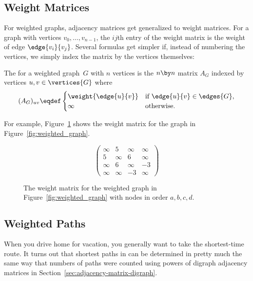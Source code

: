 \subsection{Weight Matrices}

\iffalse
  \textcolor{red}{replaced by ARM with the next paragraph}: There are many
  ways to represent a graph.  We have already seen two ways: you can draw
  it, as in Figure~\ref{fig:weighted_graph} for example, or you can
  represent it with sets of vertices and edges.  Another common
  representation is with an adjacency matrix.
\fi

For weighted graphs, adjacency matrices get generalized to weight
matrices.  For a graph with vertices $v_0,\dots,v_{n-1}$, the $ij$th
entry of the weight matrix is the weight of edge $\edge{v_i}{v_j}$.
Several formulas get simpler if, instead of numbering the vertices, we
simply index the matrix by the vertices themselves:
\begin{definition}\label{def:weighted_adjacency_matrix}
The  for a weighted graph~$G$ with $n$ vertices is
the $n \by n$ matrix $A_G$ indexed by vertices $u,v \in \vertices{G}$
where
\[
  (A_G)_{uv} \eqdef \begin{cases}
                \weight{\edge{u}{v}} & \text{if $\edge{u}{v} \in \edges{G}$}, \\
                \infty         & \text{otherwise.}
              \end{cases}
\]
\end{definition}

For example, Figure~\ref{fig:adjacency_matrix} shows the weight matrix
for the graph in Figure~\ref{fig:weighted_graph}.

\begin{figure}\redrawntrue
\[
 \begin{pmatrix}
\infty & 5 & \infty & \infty \\
5 & \infty & 6 & \infty \\
\infty & 6 & \infty & -3 \\
\infty & \infty & -3 & \infty
       \end{pmatrix}
\]

\caption{The weight matrix for the weighted graph in
  Figure~\ref{fig:weighted_graph} with nodes in order $a,b,c,d$.}
\label{fig:adjacency_matrix}
\end{figure}

\subsection{Weighted Paths}
When you drive home for vacation, you generally want to take the
shortest-time route.  It turns out that shortest paths in can be
determined in pretty much the same way that numbers of paths were
counted using powers of digraph adjacency matrices in
Section~\ref{sec:adjacency-matrix-digraph}.

